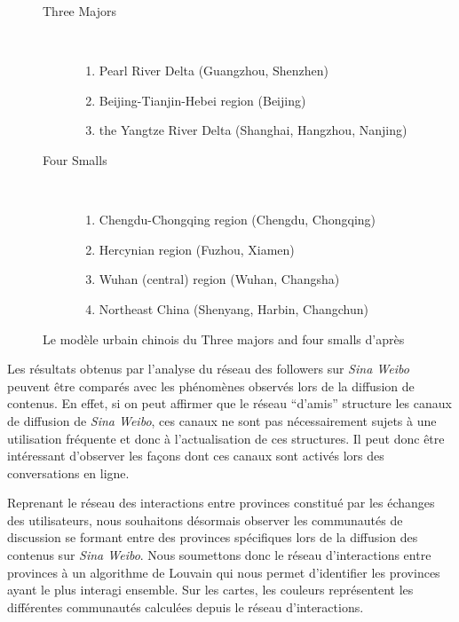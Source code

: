 \begin{figure}[htbp]
    \centering
    
    \begin{description}
    \item[Three Majors]
        \hfill \\
      \begin{enumerate}
      \item Pearl River Delta (Guangzhou, Shenzhen)
      \item Beijing-Tianjin-Hebei region (Beijing)
      \item the Yangtze River Delta (Shanghai, Hangzhou, Nanjing)
      \end{enumerate}

    \item[Four Smalls]
    \hfill \\
      \begin{enumerate}
      \item Chengdu-Chongqing region (Chengdu, Chongqing)
      \item Hercynian region (Fuzhou, Xiamen)
      \item Wuhan (central) region (Wuhan, Changsha)
      \item Northeast China (Shenyang, Harbin, Changchun)
      \end{enumerate}

    \end{description}

   \caption{
      Le modèle urbain chinois du Three majors and four smalls d{\textquoteright}après \cite{Zhen2013}
    }
\end{figure}

Les résultats obtenus par l'analyse du réseau des followers sur \textit{Sina Weibo} peuvent être comparés avec les phénomènes observés lors de la diffusion de contenus. En effet, si on peut affirmer que le réseau {\textquotedblleft}d{\textquoteright}amis{\textquotedblright} structure les canaux de diffusion de \textit{Sina Weibo}, ces canaux ne sont pas nécessairement sujets \`a une utilisation fréquente et donc \`a l{\textquoteright}actualisation de ces structures. Il peut donc être intéressant d'observer les façons dont ces canaux sont activés lors des conversations en ligne.

Reprenant le réseau des interactions entre provinces constitué par les échanges des utilisateurs, nous souhaitons désormais observer les communautés de discussion se formant entre des provinces spécifiques lors de la diffusion des contenus sur \textit{Sina Weibo}. Nous soumettons donc le réseau d{\textquoteright}interactions entre provinces \`a un algorithme de Louvain \citep{Blondel2008} qui nous permet d'identifier les provinces ayant le plus interagi ensemble. Sur les cartes, les couleurs représentent les différentes communautés calculées depuis le réseau d{\textquoteright}interactions. 

